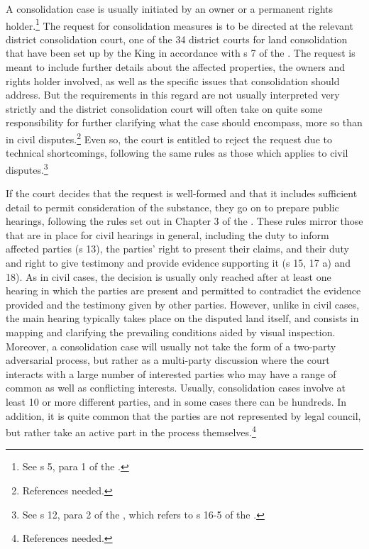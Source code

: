 A consolidation case is usually initiated by an owner or a permanent rights holder.\footnote{See s 5, para 1 of the \cite{lca79}.} The request for consolidation measures is to be directed at the relevant district consolidation court, one of the 34 district courts for land consolidation that have been set up by the King in accordance with s 7 of the \cite{lca79}. The request is meant to include further details about the affected properties, the owners and rights holder involved, as well as the specific issues that consolidation should address. But the requirements in this regard are not usually interpreted very strictly and the district consolidation court will often take on quite some responsibility for further clarifying what the case should encompass, more so than in civil disputes.\footnote{References needed.} Even so, the court is entitled to reject the request due to technical shortcomings, following the same rules as those which applies to civil disputes.\footnote{See s 12, para 2 of the \cite{lca79}, which refers to s 16-5 of the \cite{cda05}.}

If the court decides that the request is well-formed and that it includes sufficient detail to permit consideration of the substance, they go on to prepare public hearings, following the rules set out in Chapter 3 of the \cite{lca79}. These rules mirror those that are in place for civil hearings in general, including the duty to inform affected parties (s 13), the parties' right to present their claims, and their duty and right to give testimony and provide evidence supporting it (s 15, 17 a) and 18). As in civil cases, the decision is usually only reached after at least one hearing in which the parties are present and permitted to contradict the evidence provided and the testimony given by other parties. However, unlike in civil cases, the main hearing typically takes place on the disputed land itself, and consists in mapping and clarifying the prevailing conditions aided by visual inspection. Moreover, a consolidation case will usually not take the form of a two-party adversarial process, but rather as a multi-party discussion where the court interacts with a large number of interested parties who may have a range of common as well as conflicting interests. Usually, consolidation cases involve at least 10 or more different parties, and in some cases there can be hundreds. In addition, it is quite common that the parties are not represented by legal council, but rather take an active part in the process themselves.\footnote{References needed.}

